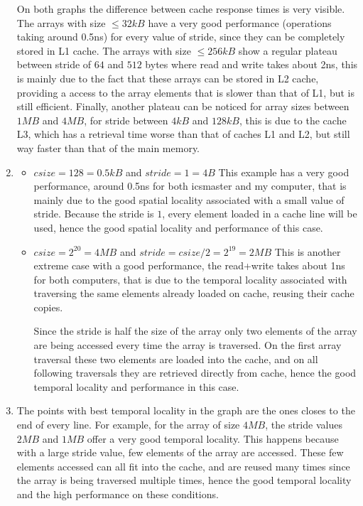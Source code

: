 \documentclass[unicode,11pt,a4paper,oneside,numbers=endperiod,openany]{scrartcl}
\begin{document}
\begin{enumerate}
        On both graphs the difference between cache response times is very visible.
        The arrays with size $\leq 32kB$ have a very good performance (operations taking around 0.5ns) for every value of stride, since they can be completely stored in L1 cache.
        The arrays with size $\leq 256kB$ show a regular plateau between stride of $64$ and $512$ bytes where read and write takes about 2ns, this is mainly due to the fact that these arrays can be stored in L2 cache, providing a access to the array elements that is slower than that of L1, but is still efficient.
        Finally, another plateau can be noticed for array sizes between $1MB$ and $4MB$, for stride between $4kB$ and $128kB$, this is due to the cache L3, which has a retrieval time worse than that of caches L1 and L2, but still way faster than that of the main memory.

        \item 
            \begin{itemize}
                \item $csize = 128 = 0.5kB$ and $stride = 1 = 4B$
                    This example has a very good performance, around 0.5ns for both icsmaster and my computer, that is mainly due to the good spatial locality associated with a small value of stride.
                    Because the stride is $1$, every element loaded in a cache line will be used, hence the good spatial locality and performance of this case.

                \item $csize = 2^{20} = 4MB$ and $stride = csize/2 = 2^{19} = 2MB$
                    This is another extreme case with a good performance, the read+write takes about 1ns for both computers, that is due to the temporal locality associated with traversing the same elements already loaded on cache, reusing their cache copies.
                    
                    Since the stride is half the size of the array only two elements of the array are being accessed every time the array is traversed.
                    On the first array traversal these two elements are loaded into the cache, and on all following traversals they are retrieved directly from cache, hence the good temporal locality and performance in this case.
            \end{itemize}

        \item  The points with best temporal locality in the graph are the ones closes to the end of every line.
            For example, for the array of size $4MB$, the stride values $2MB$ and $1MB$ offer a very good temporal locality.
            This happens because with a large stride value, few elements of the array are accessed. 
            These few elements accessed can all fit into the cache, and are reused many times since the array is being traversed multiple times, hence the good temporal locality and the high performance on these conditions.


\end{enumerate}
\end{document}
